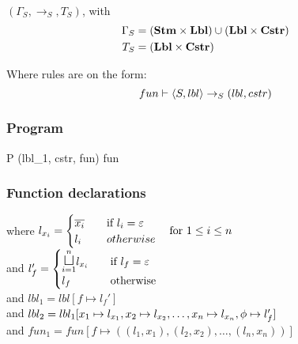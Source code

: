 \paragraph{}\noindent
$(\Gamma_S, \rightarrow_S, T_S)$, with
\begin{align*}
  \Gamma_S & = (\mathbf{Stm} \times \mathbf{Lbl}) \cup (\mathbf{Lbl} \times \mathbf{Cstr}) \\
  T_S & = (\mathbf{Lbl} \times \mathbf{Cstr})
\end{align*}

\noindent
Where rules are on the form:
\[ fun \vdash \langle S, lbl \rangle \rightarrow_{S} (lbl, cstr) \]

\subsubsection{Program}

        {}
        { \quad
          }
        {}
\begin{trules}
        { {P} {(lbl_1, cstr, fun)} }
        {fun \vdash {}}
        {}
\end{trules}

\subsubsection{Function declarations}

        {}
        {}
        {where $l_{x_i} = \begin{cases}
          \overline{x_i} & \quad \text{if } l_i = \varepsilon \\
          l_i & \quad otherwise
        \end{cases}\quad \text{for } 1 \leq i \leq n$ \\
          and $l_f' = \begin{cases}
            \mathlarger\sqcupl_{i = 1}^n l_{x_i} & \quad \text{if } l_f = \varepsilon \\
            l_f & \quad \text{otherwise}
        \end{cases}$ \\
          and $lbl_1 = lbl[f \mapsto l_f']$ \\
          and $lbl_2 = lbl_1[x_1 \mapsto l_{x_1}, x_2 \mapsto l_{x_2}, \dots, x_n \mapsto l_{x_n}, \phi \mapsto l_f']$ \\
          and $fun_1 = fun[f \mapsto ((l_1, x_1), (l_2, x_2), \dots, (l_n, x_n))]$}

